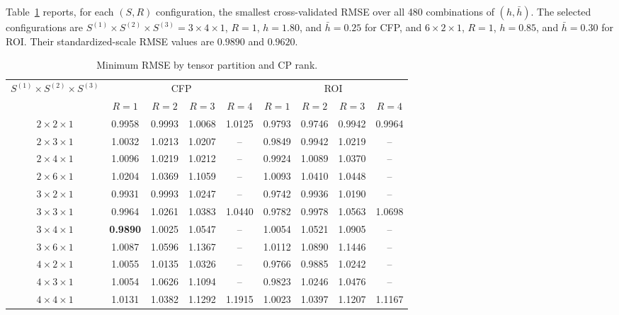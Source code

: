 \documentclass[10pt]{notes}
\begin{document}
Table~\ref{tab:grape-hyperparameter-cv} reports, for each $(S,R)$ configuration, the smallest cross-validated RMSE over all 480 combinations of $(h,\bar h)$. The selected configurations are $S^{(1)}\times S^{(2)}\times S^{(3)}=3\times4\times1$, $R=1$, $h=1.80$, and $\bar h=0.25$ for CFP, and $6\times2\times1$, $R=1$, $h=0.85$, and $\bar h=0.30$ for ROI. Their standardized-scale RMSE values are $0.9890$ and $0.9620$.

\begin{table}[!htbp]
    \centering
    \caption{Minimum RMSE by tensor partition and CP rank.}
    \label{tab:grape-hyperparameter-cv}
    \setlength{\tabcolsep}{4pt}
    \renewcommand{\arraystretch}{1.08}
    \begin{tabular}{c|cccc|cccc}
        \hline
        \multirow{2}{*}{$S^{(1)}\times S^{(2)}\times S^{(3)}$}
        & \multicolumn{4}{c|}{CFP}
        & \multicolumn{4}{c}{ROI} \\
        \cline{2-9}
        & $R=1$ & $R=2$ & $R=3$ & $R=4$
        & $R=1$ & $R=2$ & $R=3$ & $R=4$ \\
        \hline
        $2\times2\times1$ & 0.9958 & 0.9993 & 1.0068 & 1.0125 & 0.9793 & 0.9746 & 0.9942 & 0.9964 \\
        $2\times3\times1$ & 1.0032 & 1.0213 & 1.0207 & -- & 0.9849 & 0.9942 & 1.0219 & -- \\
        $2\times4\times1$ & 1.0096 & 1.0219 & 1.0212 & -- & 0.9924 & 1.0089 & 1.0370 & -- \\
        $2\times6\times1$ & 1.0204 & 1.0369 & 1.1059 & -- & 1.0093 & 1.0410 & 1.0448 & -- \\
        $3\times2\times1$ & 0.9931 & 0.9993 & 1.0247 & -- & 0.9742 & 0.9936 & 1.0190 & -- \\
        $3\times3\times1$ & 0.9964 & 1.0261 & 1.0383 & 1.0440 & 0.9782 & 0.9978 & 1.0563 & 1.0698 \\
        $3\times4\times1$ & \textbf{0.9890} & 1.0025 & 1.0547 & -- & 1.0054 & 1.0521 & 1.0905 & -- \\
        $3\times6\times1$ & 1.0087 & 1.0596 & 1.1367 & -- & 1.0112 & 1.0890 & 1.1446 & -- \\
        $4\times2\times1$ & 1.0055 & 1.0135 & 1.0326 & -- & 0.9766 & 0.9885 & 1.0242 & -- \\
        $4\times3\times1$ & 1.0054 & 1.0626 & 1.1094 & -- & 0.9823 & 1.0246 & 1.0476 & -- \\
        $4\times4\times1$ & 1.0131 & 1.0382 & 1.1292 & 1.1915 & 1.0023 & 1.0397 & 1.1207 & 1.1167 \\

\end{tabular}
\end{table}
\end{document}
